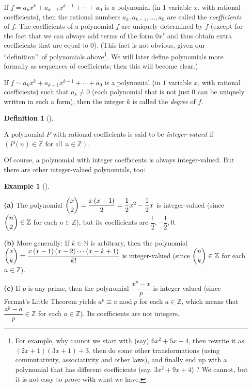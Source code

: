 \documentclass[numbers=enddot,12pt,final,onecolumn,notitlepage]{scrartcl}%
\numberwithin{exer}{subsection}
\theoremstyle{definition}
\newtheorem{defi}[theo]{Definition}
\newenvironment{definition}[1][]
{\begin{defi}[#1]\begin{leftbar}}
{\end{leftbar}\end{defi}}
\newtheorem{exam}[theo]{Example}
\newenvironment{example}[1][]
{\begin{exam}[#1]\begin{leftbar}}
{\end{leftbar}\end{exam}}
\begin{document}
If $f=a_{k}x^{k}+a_{k-1}x^{k-1}+\cdots+a_{0}$ is a polynomial (in $1$ variable
$x$, with rational coefficients), then the rational numbers $a_{k}%
,a_{k-1},\ldots,a_{0}$ are called the \textit{coefficients} of $f$. The
coefficients of a polynomial $f$ are uniquely determined by $f$ (except for
the fact that we can always add terms of the form $0x^{\ell}$ and thus obtain
extra coefficients that are equal to $0$). (This fact is not obvious, given
our \textquotedblleft definition\textquotedblright\ of polynomials
above\footnote{For example, why cannot we start with (say) $6x^{2}+5x+4$, then
rewrite it as $\left(  2x+1\right)  \left(  3x+1\right)  +3$, then do some
other transformations (using commutativity, associativity and other laws), and
finally end up with a polynomial that has different coefficients (say,
$3x^{2}+9x+4$) ? We cannot, but it is not easy to prove with what we have.}.
We will later define polynomials more formally as sequences of coefficients;
then this will become clear.)

If $f=a_{k}x^{k}+a_{k-1}x^{k-1}+\cdots+a_{0}$ is a polynomial (in $1$ variable
$x$, with rational coefficients) such that $a_{k}\neq0$ (each polynomial that
is not just $0$ can be uniquely written in such a form), then the integer $k$
is called the \textit{degree} of $f$.

\begin{definition}
\label{def.ivp.ivp}A polynomial $P$ with rational coefficients is said to be
\textit{integer-valued} if $\left(  P\left(  n\right)  \in\mathbb{Z}\text{ for
all }n\in\mathbb{Z}\right)  $.
\end{definition}

Of course, a polynomial with integer coefficients is always integer-valued.
But there are other integer-valued polynomials, too:

\begin{example}
\label{exa.ivp.ivps1}\textbf{(a)} The polynomial $\dbinom{x}{2}=\dfrac
{x\left(  x-1\right)  }{2}=\dfrac{1}{2}x^{2}-\dfrac{1}{2}x$ is integer-valued
(since $\dbinom{n}{2}\in\mathbb{Z}$ for each $n\in\mathbb{Z}$), but its
coefficients are $\dfrac{1}{2},-\dfrac{1}{2},0$.

\textbf{(b)} More generally: If $k\in\mathbb{N}$ is arbitrary, then the
polynomial $\dbinom{x}{k}=\dfrac{x\left(  x-1\right)  \left(  x-2\right)
\cdots\left(  x-k+1\right)  }{k!}$ is integer-valued (since $\dbinom{n}{k}%
\in\mathbb{Z}$ for each $n\in\mathbb{Z}$).

\textbf{(c)} If $p$ is any prime, then the polynomial $\dfrac{x^{p}-x}{p}$ is
integer-valued (since Fermat's Little Theorem yields $a^{p}\equiv
a\operatorname{mod}p$ for each $a\in\mathbb{Z}$, which means that
$\dfrac{a^{p}-a}{p}\in\mathbb{Z}$ for each $a\in\mathbb{Z}$). Its coefficients
are not integers.
\end{example}
\end{document}
